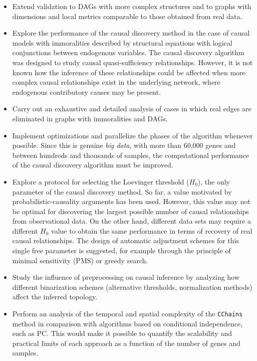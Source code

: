 \documentclass[12pt,a4paper]{report}
\begin{document}
\begin{itemize}
\item Extend validation to DAGs with more complex structures and to graphs with dimensions and local metrics comparable to those obtained from real data.

\item Explore the performance of the causal discovery method in the case of causal models with immoralities described by structural equations with logical conjunctions between endogenous variables. The causal discovery algorithm was designed to study causal quasi-sufficiency relationships. However, it is not known how the inference of these relationships could be affected when more complex causal relationships exist in the underlying network, where endogenous contributory causes may be present.

\item Carry out an exhaustive and detailed analysis of cases in which real edges are eliminated in graphs with immoralities and DAGs.

\item Implement optimizations and parallelize the phases of the algorithm whenever possible. Since this is genuine \textit{big data}, with more than 60,000 genes and between hundreds and thousands of samples, the computational performance of the causal discovery algorithm must be improved.

\item Explore a protocol for selecting the Loevinger threshold (\(H_0\)), the only parameter of the causal discovery method. So far, a value motivated by probabilistic-causality arguments has been used. However, this value may not be optimal for discovering the largest possible number of causal relationships from observational data. On the other hand, different data sets may require a different \(H_0\) value to obtain the same performance in terms of recovery of real causal relationships. The design of automatic adjustment schemes for this single free parameter is suggested, for example through the principle of minimal sensitivity (PMS) or greedy search.

\item Study the influence of preprocessing on causal inference by analyzing how different binarization schemes (alternative thresholds, normalization methods) affect the inferred topology.

\item Perform an analysis of the temporal and spatial complexity of the \texttt{CChains} method in comparison with algorithms based on conditional independence, such as PC. This would make it possible to quantify the scalability and practical limits of each approach as a function of the number of genes and samples.


\end{itemize}
\end{document}
